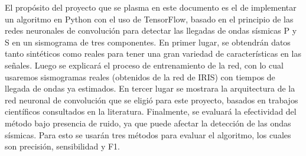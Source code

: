 \documentclass[../main.tex]{subfiles}
\begin{document}
El propósito del proyecto que se plasma en este documento es el de implementar un algoritmo en Python con el uso de TensorFlow, basado en el principio de las redes neuronales de convolución para detectar las llegadas de ondas sísmicas P y S en un sismograma de tres componentes. En primer lugar, se obtendrán datos tanto sintéticos como reales para tener una gran variedad de características en las señales. Luego se explicará el proceso de entrenamiento de la red, con lo cual usaremos sismogramas reales (obtenidos de la red de IRIS) con tiempos de llegada de ondas ya estimados. En tercer lugar se mostrara la arquitectura de la red neuronal de convolución que se eligió para este proyecto, basados en trabajos científicos consultados en la literatura. Finalmente, se evaluará la efectividad del método bajo presencia de ruido, ya que puede afectar la detección de las ondas sísmicas. Para esto se usarán tres métodos para evaluar el algoritmo, los cuales son precisión, sensibilidad y F1. \\























 
\end{document}
